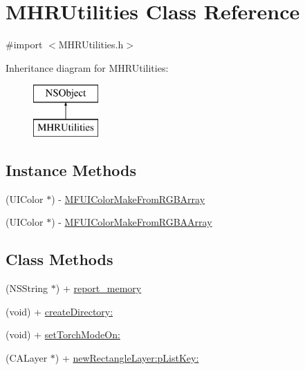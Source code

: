 \hypertarget{interface_m_h_r_utilities}{\section{M\+H\+R\+Utilities Class Reference}
\label{interface_m_h_r_utilities}
}


{\ttfamily \#import $<$M\+H\+R\+Utilities.\+h$>$}

Inheritance diagram for M\+H\+R\+Utilities\+:\begin{figure}[H]
\begin{center}
\leavevmode
\includegraphics[height=2.000000cm]{interface_m_h_r_utilities}
\end{center}
\end{figure}
\subsection*{Instance Methods}
\begin{DoxyCompactItemize}
\item 
(U\+I\+Color $\ast$) -\/ \hyperlink{interface_m_h_r_utilities_a92885094add75d90dfb00faaf36d423e}{M\+F\+U\+I\+Color\+Make\+From\+R\+G\+B\+Array}
\item 
(U\+I\+Color $\ast$) -\/ \hyperlink{interface_m_h_r_utilities_a824edf59b4a4e127db0f4248c4d4bfd6}{M\+F\+U\+I\+Color\+Make\+From\+R\+G\+B\+A\+Array}
\end{DoxyCompactItemize}
\subsection*{Class Methods}
\begin{DoxyCompactItemize}
\item 
(N\+S\+String $\ast$) + \hyperlink{interface_m_h_r_utilities_a1f7c42bb731cae8fb90d106014b00df9}{report\+\_\+memory}
\item 
(void) + \hyperlink{interface_m_h_r_utilities_a85f3406abe6ae8911d4a8349996e1d6c}{create\+Directory\+:}
\item 
(void) + \hyperlink{interface_m_h_r_utilities_a4c2719ba1e46c5491a9868ab93dc8cfe}{set\+Torch\+Mode\+On\+:}
\item 
(C\+A\+Layer $\ast$) + \hyperlink{interface_m_h_r_utilities_aced58e360114134fcc1982a6862fc523}{new\+Rectangle\+Layer\+:p\+List\+Key\+:}
\end{DoxyCompactItemize}



